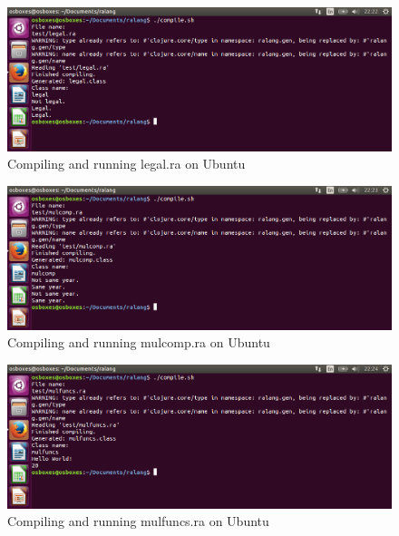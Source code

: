 \documentclass[a4paper]{article}
\begin{document}
\begin{appendices}
	\newpage
	\begin{figure}[h!]
		\centering
		\includegraphics[width=\linewidth]{images/ubuntu_legal.png}
		\caption[Compiling and running legal.ra on Ubuntu 15.10 64-bit]{Compiling and running legal.ra on Ubuntu}
		\label{fig:ubuntu_legal}
	\end{figure}
	\begin{figure}[h!]
		\centering
		\includegraphics[width=\linewidth]{images/ubuntu_mulcomp.png}
		\caption[Compiling and running mulcomp.ra on Ubuntu 15.10 64-bit]{Compiling and running mulcomp.ra on Ubuntu}
		\label{fig:ubuntu_mulcomp}
	\end{figure}
	\begin{figure}[h!]
		\centering
		\includegraphics[width=\linewidth]{images/ubuntu_mulfuncs.png}
		\caption[Compiling and running mulfuncs.ra on Ubuntu 15.10 64-bit]{Compiling and running mulfuncs.ra on Ubuntu}
		\label{fig:ubuntu_mulfuncs}
	\end{figure}
	\newpage
	\begin{figure}[h!]
		\centering

\end{figure}
\end{appendices}
\end{document}
